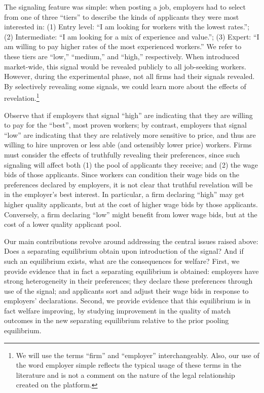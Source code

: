 The signaling feature was simple: when posting a job, employers had to select from one of three ``tiers'' to describe the kinds of applicants they were most interested in:
(1) Entry level: ``I am looking for workers with the lowest rates.'';
(2) Intermediate: ``I am looking for a mix of experience and value.'';
(3) Expert: ``I am willing to pay higher rates of the most experienced workers.''
We refer to these tiers are ``low,'' ``medium,'' and ``high,'' respectively.
When introduced market-wide, this signal would be revealed publicly to all job-seeking workers. 
However, during the experimental phase, not all firms had their signals revealed.
By selectively revealing some signals, we could learn more about the effects of revelation.\footnote{
  We will use the terms ``firm'' and ``employer'' interchangeably. Also, our use of the word employer simple reflects the typical usage of these terms in the literature and is not a comment on the nature of the legal relationship created on the platform. 
} 

Observe that if employers that signal ``high'' are indicating that they are willing to pay for the ``best'', most proven workers; by contrast, employers that signal ``low'' are indicating that they are relatively more sensitive to price, and thus are willing to hire unproven or less able (and ostensibly lower price) workers.  
Firms must consider the effects of truthfully revealing their preferences, since such signaling will affect both (1) the pool of applicants they receive; and (2) the wage bids of those applicants. 
Since workers can condition their wage bids on the preferences declared by employers, it is not clear that truthful revelation will be in the employer's best interest.
In particular, a firm declaring ``high'' may get higher quality applicants, but at the cost of higher wage bids by those applicants.
Conversely, a firm declaring ``low'' might benefit from lower wage bids, but at the cost of a lower quality applicant pool.

Our main contributions revolve around addressing the central issues raised above: Does a separating equilibrium obtain upon introduction of the signal?
And if such an equilibrium exists, what are the consequences for welfare?  
First, we provide evidence that in fact a separating equilibrium is obtained: employers have strong heterogeneity in their preferences; they declare these preferences through use of the signal; and applicants sort and adjust their wage bids in response to employers' declarations.
Second, we provide evidence that this equilibrium is in fact welfare improving, by studying improvement in the quality of match outcomes in the new separating equilibrium relative to the prior pooling equilibrium.

